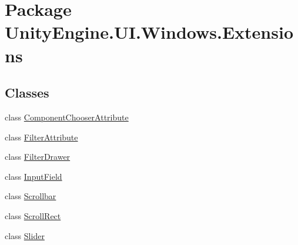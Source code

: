 \hypertarget{namespace_unity_engine_1_1_u_i_1_1_windows_1_1_extensions}{}\section{Package Unity\+Engine.\+U\+I.\+Windows.\+Extensions}
\label{namespace_unity_engine_1_1_u_i_1_1_windows_1_1_extensions}
\subsection*{Classes}
\begin{DoxyCompactItemize}
\item 
class \hyperlink{class_unity_engine_1_1_u_i_1_1_windows_1_1_extensions_1_1_component_chooser_attribute}{Component\+Chooser\+Attribute}
\item 
class \hyperlink{class_unity_engine_1_1_u_i_1_1_windows_1_1_extensions_1_1_filter_attribute}{Filter\+Attribute}
\item 
class \hyperlink{class_unity_engine_1_1_u_i_1_1_windows_1_1_extensions_1_1_filter_drawer}{Filter\+Drawer}
\item 
class \hyperlink{class_unity_engine_1_1_u_i_1_1_windows_1_1_extensions_1_1_input_field}{Input\+Field}
\item 
class \hyperlink{class_unity_engine_1_1_u_i_1_1_windows_1_1_extensions_1_1_scrollbar}{Scrollbar}
\item 
class \hyperlink{class_unity_engine_1_1_u_i_1_1_windows_1_1_extensions_1_1_scroll_rect}{Scroll\+Rect}
\item 
class \hyperlink{class_unity_engine_1_1_u_i_1_1_windows_1_1_extensions_1_1_slider}{Slider}
\end{DoxyCompactItemize}
